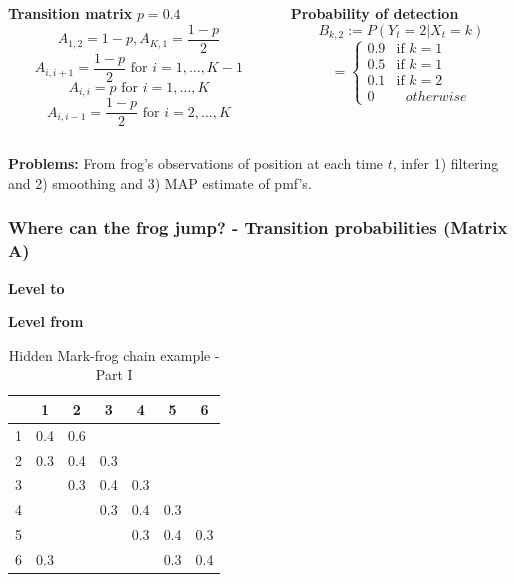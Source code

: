 \documentclass[xcolor=dvipsnames, compress]{beamer}
\begin{document}
\begin{frame}
\begin{columns}
\begin{column}{0.5\textwidth}
\textbf{Transition matrix}
$p=0.4$
$$A_{1,2} = 1-p, A_{K,1} = \frac{1-p}{2}$$
$$ A_{i,i+1} = \frac{1-p}{2} \mbox{ for } i=1,\ldots, K-1$$
$$ A_{i,i} = p \mbox{ for } i=1,\ldots, K$$
$$ A_{i,i-1} = \frac{1-p}{2} \mbox{ for } i=2,\ldots, K$$
\end{column}
\begin{column}{0.5\textwidth}  %
\textbf{Probability of detection}
$$B_{k,2}:= P(Y_t=2|X_t=k) $$ 
$$=\begin{cases} 0.9 &\mbox{if } k=1 \\
0.5 & \mbox{if } k=1 \\
0.1 & \mbox{if } k=2 \\
0 & \mbox{ } otherwise
\end{cases}$$	

\end{column}
\end{columns}

\vspace{0.5cm}

\textbf{Problems:} From frog’s observations of position at each time $t$, infer 1) filtering and 2) smoothing and 3) MAP estimate of pmf's.

\end{frame}

%
\begin{frame}
\frametitle{Where can the frog jump? - Transition probabilities (Matrix A)}

\begin{center}
\begin{table}
\begin{centering}
\textbf{Level to}
\par\end{centering}
\begin{centering}
\textbf{Level from}
\begin{tabular}{|c|c|c|c|c|c|c|}
\hline 
& 1 & 2 & 3 & 4 & 5 & 6\tabularnewline
\hline 
\hline 
1 & 0.4 & 0.6 &  &  &  & \tabularnewline
\hline 
2 & 0.3 & 0.4 & 0.3 &  &  & \tabularnewline
\hline 
3 &  & 0.3 & 0.4 & 0.3 &  & \tabularnewline
\hline 
4 &  &  & 0.3 & 0.4 & 0.3 & \tabularnewline
\hline 
5 &  &  &  & 0.3 & 0.4 & 0.3\tabularnewline
\hline 
6 & 0.3 &  &  &  & 0.3 & 0.4\tabularnewline
\hline 
\end{tabular}
\par\end{centering}
\caption{Hidden Mark-frog chain example - Part I}

\end{table}
\par\end{center}
\end{frame}
%
\end{document}
